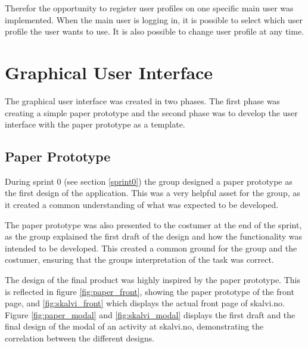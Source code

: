 Therefor the opportunity to register user profiles on one specific main user was implemented. When the main user is logging in, it is possible to select which user profile the user wants to use. It is also possible to change user profile at any time.

\section{Graphical User Interface}
The graphical user interface was created in two phases. The first phase was creating a simple paper prototype and the second phase was to develop the user interface with the paper prototype as a template.

\subsection{Paper Prototype} \label{ss:paper_prototype}
During sprint 0 (see section \ref{sprint0}) the group designed a paper prototype as the first design of the application. This was a very helpful asset for the group, as it created a common understanding of what was expected to be developed.

The paper prototype was also presented to the costumer at the end of the sprint, as the group explained the first draft of the design and how the functionality was intended to be developed. This created a common ground for the group and the costumer, ensuring that the groups interpretation of the task was correct. 

The design of the final product was highly inspired by the paper prototype. This is reflected in figure \ref{fig:paper_front}, showing the paper prototype of the front page, and \ref{fig:skalvi_front} which displays the actual front page of skalvi.no. Figure \ref{fig:paper_modal} and \ref{fig:skalvi_modal} displays the first draft and the final design of the modal of an activity at skalvi.no, demonstrating the correlation between the different designs.  

